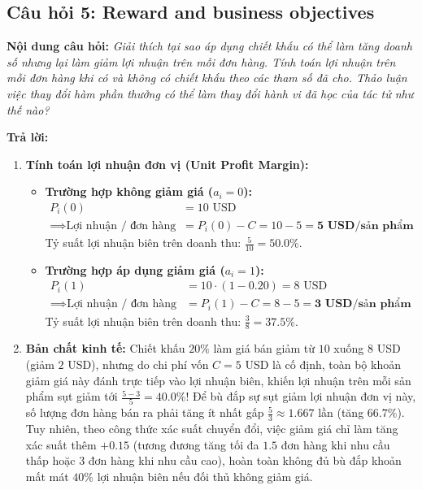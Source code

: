 \documentclass[12pt,a4paper]{article}
\begin{document}
\subsection{Câu hỏi 5: Reward and business objectives}
\textbf{Nội dung câu hỏi:} \textit{Giải thích tại sao áp dụng chiết khấu có thể làm tăng doanh số nhưng lại làm giảm lợi nhuận trên mỗi đơn hàng. Tính toán lợi nhuận trên mỗi đơn hàng khi có và không có chiết khấu theo các tham số đã cho. Thảo luận việc thay đổi hàm phần thưởng có thể làm thay đổi hành vi đã học của tác tử như thế nào?}

\textbf{Trả lời:}
\begin{enumerate}
    \item \textbf{Tính toán lợi nhuận đơn vị (Unit Profit Margin):}
    \begin{itemize}
        \item \textbf{Trường hợp không giảm giá ($a_i = 0$):}
        \begin{align}
        P_i(0) &= 10 \text{ USD} \\
        \implies \text{Lợi nhuận / đơn hàng} &= P_i(0) - C = 10 - 5 = \mathbf{5 \text{ USD/sản phẩm}}
        \end{align}
        Tỷ suất lợi nhuận biên trên doanh thu: $\frac{5}{10} = \mathbf{50.0\%}$.
        \item \textbf{Trường hợp áp dụng giảm giá ($a_i = 1$):}
        \begin{align}
        P_i(1) &= 10 \cdot (1 - 0.20) = 8 \text{ USD} \\
        \implies \text{Lợi nhuận / đơn hàng} &= P_i(1) - C = 8 - 5 = \mathbf{3 \text{ USD/sản phẩm}}
        \end{align}
        Tỷ suất lợi nhuận biên trên doanh thu: $\frac{3}{8} = \mathbf{37.5\%}$.
    \end{itemize}
    \item \textbf{Bản chất kinh tế:} Chiết khấu $20\%$ làm giá bán giảm từ $10$ xuống $8$ USD (giảm $2$ USD), nhưng do chi phí vốn $C = 5$ USD là cố định, toàn bộ khoản giảm giá này đánh trực tiếp vào lợi nhuận biên, khiến lợi nhuận trên mỗi sản phẩm sụt giảm tới $\frac{5 - 3}{5} = \mathbf{40.0\%}$!
    Để bù đắp sự sụt giảm lợi nhuận đơn vị này, số lượng đơn hàng bán ra phải tăng ít nhất gấp $\frac{5}{3} \approx 1.667$ lần (tăng $66.7\%$). Tuy nhiên, theo công thức xác suất chuyển đổi, việc giảm giá chỉ làm tăng xác suất thêm $+0.15$ (tương đương tăng tối đa $1.5$ đơn hàng khi nhu cầu thấp hoặc $3$ đơn hàng khi nhu cầu cao), hoàn toàn không đủ bù đắp khoản mất mát $40\%$ lợi nhuận biên nếu đối thủ không giảm giá.

\end{enumerate}
\end{document}
